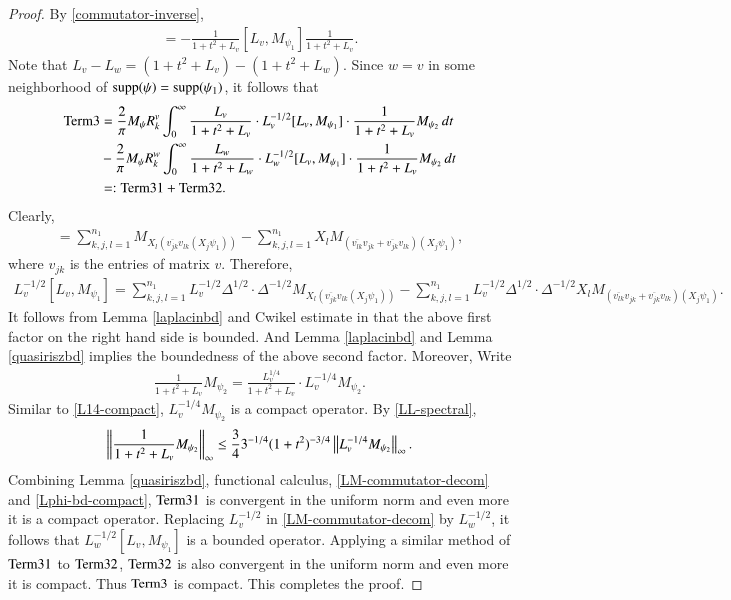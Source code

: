 \documentclass[leqno]{amsart}
\begin{document}
\begin{proof}
		By \eqref{commutator-inverse},
		\begin{align*}
			[\frac{1}{1+t^{2}+L_{v}},M_{\psi_{1}}]=-\frac{1}{1+t^{2}+L_{v}}[L_{v},M_{\psi_{1}}]\frac{1}{1+t^{2}+L_{v}}.
		\end{align*}
		Note that $L_{v}-L_{w}=(1+t^{2}+L_{v})-(1+t^{2}+L_{w})$. Since $w=v$ in some neighborhood of ${\rm supp}(\psi)={\rm supp}(\psi_{1})$, it follows that
		\begin{align*}
			{\rm Term3}
			&=\frac{2}{\pi}M_{\psi}{ R}^{v}_{k}\int_{0}^{\infty}\frac{L_{v}}{1+t^{2}+L_{v}}\cdot L_{v}^{-1/2}[L_{v},M_{\psi_{1}}]\cdot\frac{1}{1+t^{2}+L_{v}}M_{\psi_{2}}\,dt\\
			&-\frac{2}{\pi}M_{\psi}{ R}^{w}_{k}\int_{0}^{\infty}\frac{L_{w}}{1+t^{2}+L_{w}}\cdot L_{w}^{-1/2}[L_{v},M_{\psi_{1}}]\cdot\frac{1}{1+t^{2}+L_{v}}M_{\psi_{2}}\,dt\\
			&=:{\rm Term31}+{\rm Term32}.
		\end{align*}
		Clearly, 
		\begin{align*}
			[L_{v},M_{\psi_{1}}]=\sum_{k,j,l=1}^{n_{1}}M_{X_{l}(\overline{v_{jk}}v_{lk}(X_{j}\psi_{1}))}-
			\sum_{k,j,l=1}^{n_{1}}X_{l}M_{(\overline{v_{lk}}v_{jk}+\overline{v_{jk}}v_{lk})(X_{j}\psi_{1})},
		\end{align*}
		where $v_{jk}$ is the entries of matrix $v$.
		Therefore,
		\begin{align}\label{LM-commutator-decom}
			L_{v}^{-1/2}[L_{v},M_{\psi_{1}}]
			=\sum_{k,j,l=1}^{n_{1}}L_{v}^{-1/2}\Delta^{1/2}
			\cdot\Delta^{-1/2}M_{X_{l}(\overline{v_{jk}}v_{lk}(X_{j}\psi_{1}))}
			-\sum_{k,j,l=1}^{n_{1}}L_{v}^{-1/2}\Delta^{1/2}
			\cdot\Delta^{-1/2}X_{l}M_{(\overline{v_{lk}}v_{jk}+\overline{v_{jk}}v_{lk})(X_{j}\psi_{1})}.
		\end{align}
		It follows from Lemma \ref{laplacinbd} and Cwikel estimate in \cite{MSZ-Cwikel} that the above first factor on the right hand side is bounded.
		And Lemma \ref{laplacinbd} and Lemma \ref{quasiriszbd} implies the boundedness of the above second factor.
		Moreover, Write
		\begin{align*}
			\frac{1}{1+t^{2}+L_{v}}M_{\psi_{2}}
			=\frac{L_{v}^{1/4}}{1+t^{2}+L_{v}}\cdot L_{v}^{-1/4}M_{\psi_{2}}.
		\end{align*}
		Similar to \eqref{L14-compact}, $L_{v}^{-1/4}M_{\psi_{2}}$ is a compact operator.
		By \eqref{LL-spectral}, 
		\begin{align}\label{Lphi-bd-compact}
			\left\| \frac{1}{1+t^{2}+L_{v}}M_{\psi_{2}} \right\|_{\infty}
			\leq\frac{3}{4}3^{-1/4}(1+t^{2})^{-3/4}\left\| L_{v}^{-1/4}M_{\psi_{2}} \right\|_{\infty}.
		\end{align}
		Combining Lemma \ref{quasiriszbd}, functional calculus, \eqref{LM-commutator-decom} and \eqref{Lphi-bd-compact},  ${\rm Term31}$ is convergent in the uniform norm and even more it is a compact operator. 
		Replacing $L_{v}^{-1/2}$ in \eqref{LM-commutator-decom} by $L_{w}^{-1/2}$, it follows that $L_{w}^{-1/2}[L_{v},M_{\psi_{1}}]$ is a bounded operator.
		Applying a similar method of ${\rm Term31}$ to ${\rm Term32}$, ${\rm Term32}$ is also convergent in the uniform norm and even more it is compact. 
		Thus ${\rm Term3}$ is compact. This completes the proof.
	\end{proof}
	
\end{document}

